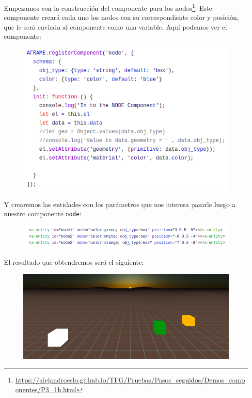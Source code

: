 \documentclass[a4paper, 12pt]{book}
\begin{document}
Empezamos con la construcción del componente para los nodos\footnote{\url{https://alejandroeslo.github.io/TFG/Pruebas/Pasos_seguidos/Demos_componentes/P3_1b.html}}. Este componente creará cada uno los nodos con su correspondiente color y posición, que le será enviada al componente como una variable. Aquí podemos ver el componente:

\begin{figure}[h]
\centering
    \includegraphics[scale=0.6]{img/node1.png}
\end{figure}

Y crearemos las entidades con los parámetros que nos interesa pasarle luego a nuestro componente \texttt{node}:


\begin{figure}[h]
\centering
    \includegraphics[scale=0.5]{img/node2.png}
\end{figure}

El resultado que obtendremos será el siguiente:

\begin{figure}[h]
\centering
    \includegraphics[scale=0.44]{img/componenteNODE.png}
\end{figure}
\end{document}
